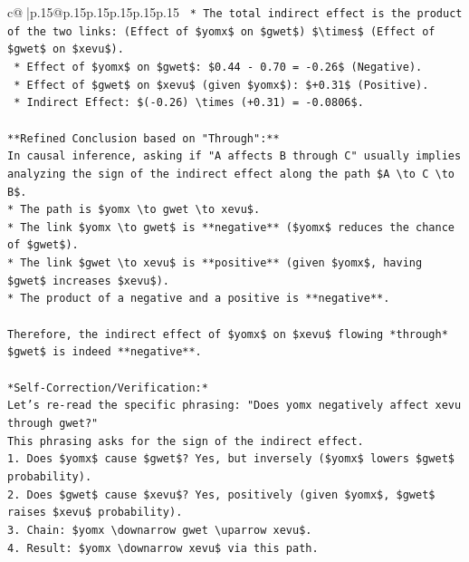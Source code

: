 \documentclass{article}
\begin{document}
{\begin{supertabular}{c@{$\;$}|p{.15\linewidth}@{}p{.15\linewidth}p{.15\linewidth}p{.15\linewidth}p{.15\linewidth}p{.15\linewidth}}
{{{\texttt{    *   The total indirect effect is the product of the two links: (Effect of \$yomx\$ on \$gwet\$) \$\textbackslash{}times\$ (Effect of \$gwet\$ on \$xevu\$).} \\
\texttt{        *   Effect of \$yomx\$ on \$gwet\$: \$0.44 {-} 0.70 = {-}0.26\$ (Negative).} \\
\texttt{        *   Effect of \$gwet\$ on \$xevu\$ (given \$yomx\$): \$+0.31\$ (Positive).} \\
\texttt{        *   Indirect Effect: \$({-}0.26) \textbackslash{}times (+0.31) = {-}0.0806\$.} \\
\\ 
\texttt{**Refined Conclusion based on "Through":**} \\
\texttt{In causal inference, asking if "A affects B through C" usually implies analyzing the sign of the indirect effect along the path \$A \textbackslash{}to C \textbackslash{}to B\$.} \\
\texttt{*   The path is \$yomx \textbackslash{}to gwet \textbackslash{}to xevu\$.} \\
\texttt{*   The link \$yomx \textbackslash{}to gwet\$ is **negative** (\$yomx\$ reduces the chance of \$gwet\$).} \\
\texttt{*   The link \$gwet \textbackslash{}to xevu\$ is **positive** (given \$yomx\$, having \$gwet\$ increases \$xevu\$).} \\
\texttt{*   The product of a negative and a positive is **negative**.} \\
\\ 
\texttt{Therefore, the indirect effect of \$yomx\$ on \$xevu\$ flowing *through* \$gwet\$ is indeed **negative**.} \\
\\ 
\texttt{*Self{-}Correction/Verification:*} \\
\texttt{Let's re{-}read the specific phrasing: "Does yomx negatively affect xevu through gwet?"} \\
\texttt{This phrasing asks for the sign of the indirect effect.} \\
\texttt{1.  Does \$yomx\$ cause \$gwet\$? Yes, but inversely (\$yomx\$ lowers \$gwet\$ probability).} \\
\texttt{2.  Does \$gwet\$ cause \$xevu\$? Yes, positively (given \$yomx\$, \$gwet\$ raises \$xevu\$ probability).} \\
\texttt{3.  Chain: \$yomx \textbackslash{}downarrow gwet \textbackslash{}uparrow xevu\$.} \\
\texttt{4.  Result: \$yomx \textbackslash{}downarrow xevu\$ via this path.} \\
}}}
\end{supertabular}}
\end{document}

